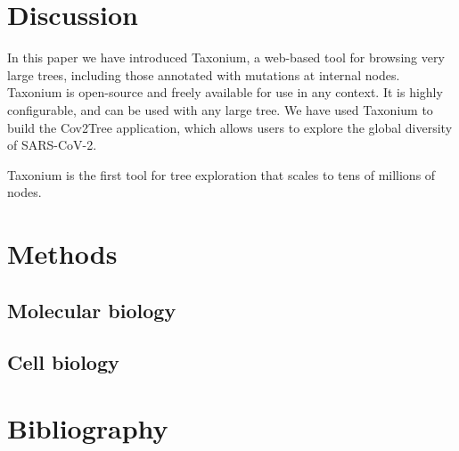 \section*{Discussion}\label{s:discussion}

In this paper we have introduced Taxonium, a web-based tool for browsing very large trees, including those annotated with mutations at internal nodes. Taxonium is open-source and freely available for use in any context. It is highly configurable, and can be used with any large tree. We have used Taxonium to build the Cov2Tree application, which allows users to explore the global diversity of SARS-CoV-2.

Taxonium is the first tool for tree exploration that scales to tens of millions of nodes. 



\section*{Methods}\label{s:methods}

\subsection*{Molecular biology}

\subsection*{Cell biology}



\section*{Bibliography}

